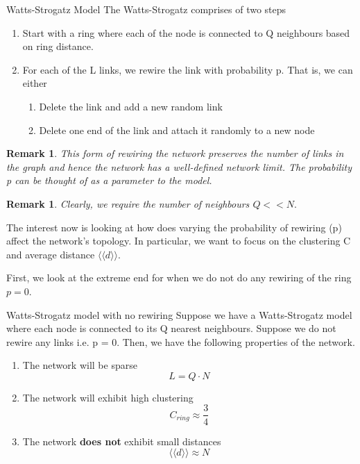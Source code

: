 \documentclass[twoside]{article}
\newtheorem{remark}[theorem]{Remark}
\begin{document}
\begin{theorem_exam}{Watts-Strogatz Model}{} The Watts-Strogatz comprises of two steps
\begin{enumerate}
\item Start with a ring where each of the node is connected to Q neighbours based on ring distance.
\item For each of the L links, we rewire the link with probability p. That is, we can either
\begin{enumerate}
\item Delete the link and add a new random link 
\item Delete one end of the link and attach it randomly to a new node
\end{enumerate}
\end{enumerate}
\end{theorem_exam}

\begin{remark} This form of rewiring the network preserves the number of links in the graph and hence the network has a well-defined network limit. The probability p can be thought of as a parameter to the model.
\end{remark}

\begin{remark}Clearly, we require the number of neighbours $Q << N.$
\end{remark}

The interest now is looking at how does varying the probability of rewiring (p) affect the network's topology. In particular, we want to focus on the clustering C and average distance $\langle \langle d \rangle \rangle.$


First, we look at the extreme end for when we do not do any rewiring of the ring $p = 0.$

\begin{proposition_exam}{Watts-Strogatz model with no rewiring}{} Suppose we have a Watts-Strogatz model where each node is connected to its Q nearest neighbours. Suppose we do not rewire any links i.e. p = 0. Then, we have the following properties of the network. 
\begin{enumerate}
\item The network will be sparse 
$$
L = Q \cdot N
$$
\item The network will exhibit high clustering 
$$
C_{ring} \approx \frac{3}{4}
$$
\item The network \textbf{does not} exhibit small distances 
$$
\langle \langle d \rangle \rangle \approx N
$$
\end{enumerate}
\end{proposition_exam}
\end{document}
